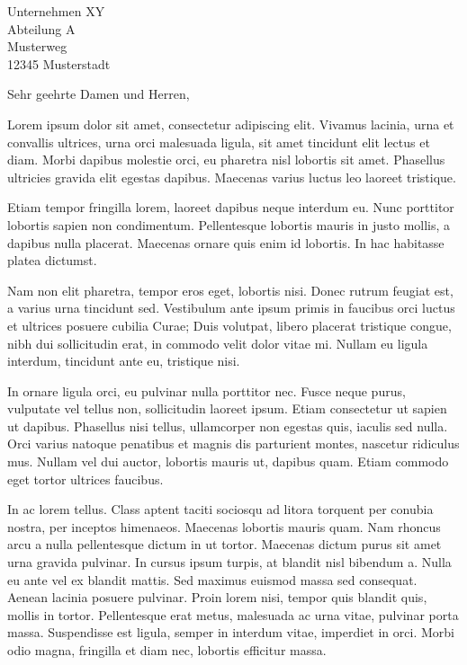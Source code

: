 \documentclass[
	foldmarks=false,
	pagenumber=false,
	backaddress=on,
	parskip=half,
	addrfield=true
]{scrlttr2}
\date{\today}
\begin{document}
 
\begin{letter}{Unternehmen XY \\ Abteilung A \\ Musterweg \\ 12345 Musterstadt}


\opening{Sehr geehrte Damen und Herren,}

Lorem ipsum dolor sit amet, consectetur adipiscing elit. Vivamus lacinia, urna et convallis ultrices, urna orci malesuada ligula, sit amet tincidunt elit lectus et diam. Morbi dapibus molestie orci, eu pharetra nisl lobortis sit amet. Phasellus ultricies gravida elit egestas dapibus. Maecenas varius luctus leo laoreet tristique.

Etiam tempor fringilla lorem, laoreet dapibus neque interdum eu. Nunc porttitor lobortis sapien non condimentum. Pellentesque lobortis mauris in justo mollis, a dapibus nulla placerat. Maecenas ornare quis enim id lobortis. In hac habitasse platea dictumst. 

Nam non elit pharetra, tempor eros eget, lobortis nisi. Donec rutrum feugiat est, a varius urna tincidunt sed. Vestibulum ante ipsum primis in faucibus orci luctus et ultrices posuere cubilia Curae; Duis volutpat, libero placerat tristique congue, nibh dui sollicitudin erat, in commodo velit dolor vitae mi. Nullam eu ligula interdum, tincidunt ante eu, tristique nisi.

In ornare ligula orci, eu pulvinar nulla porttitor nec. Fusce neque purus, vulputate vel tellus non, sollicitudin laoreet ipsum. Etiam consectetur ut sapien ut dapibus. Phasellus nisi tellus, ullamcorper non egestas quis, iaculis sed nulla. Orci varius natoque penatibus et magnis dis parturient montes, nascetur ridiculus mus. Nullam vel dui auctor, lobortis mauris ut, dapibus quam. Etiam commodo eget tortor ultrices faucibus.

In ac lorem tellus. Class aptent taciti sociosqu ad litora torquent per conubia nostra, per inceptos himenaeos. Maecenas lobortis mauris quam. Nam rhoncus arcu a nulla pellentesque dictum in ut tortor. Maecenas dictum purus sit amet urna gravida pulvinar. In cursus ipsum turpis, at blandit nisl bibendum a. Nulla eu ante vel ex blandit mattis. Sed maximus euismod massa sed consequat. Aenean lacinia posuere pulvinar. Proin lorem nisi, tempor quis blandit quis, mollis in tortor. Pellentesque erat metus, malesuada ac urna vitae, pulvinar porta massa. Suspendisse est ligula, semper in interdum vitae, imperdiet in orci. Morbi odio magna, fringilla et diam nec, lobortis efficitur massa.


\end{letter}
\end{document}
